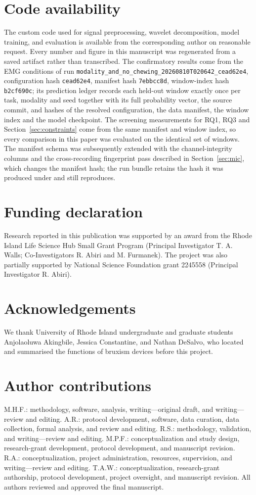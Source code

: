 \documentclass[pdflatex,sn-nature,iicol]{sn-jnl}
\begin{document}
\section*{Code availability}
The custom code used for signal preprocessing, wavelet decomposition, model training, and evaluation is available from the corresponding author on reasonable request. Every number and figure in this manuscript was regenerated from a saved artifact rather than transcribed. The confirmatory results come from the EMG conditions of run \texttt{modality\_and\_no\_chewing\_}\allowbreak\texttt{20260810T020642\_cead62e4}, configuration hash \texttt{cead62e4}, manifest hash \texttt{7ebbcc8d}, window-index hash \texttt{b2cf690c}; its prediction ledger records each held-out window exactly once per task, modality and seed together with its full probability vector, the source commit, and hashes of the resolved configuration, the data manifest, the window index and the model checkpoint. The screening measurements for RQ1, RQ3 and Section~\ref{sec:constraints} come from the same manifest and window index, so every comparison in this paper was evaluated on the identical set of windows. The manifest schema was subsequently extended with the channel-integrity columns and the cross-recording fingerprint pass described in Section~\ref{sec:mic}, which changes the manifest hash; the run bundle retains the hash it was produced under and still reproduces.

\section*{Funding declaration}
Research reported in this publication was supported by an award from the Rhode Island Life Science Hub Small Grant Program (Principal Investigator T. A. Walls; Co-Investigators R. Abiri and M. Furmanek). The project was also partially supported by National Science Foundation grant 2245558 (Principal Investigator R. Abiri).

\section*{Acknowledgements}
We thank University of Rhode Island undergraduate and graduate students Anjolaoluwa Akingbile, Jessica Constantine, and Nathan DeSalvo, who located and summarised the functions of bruxism devices before this project.

\section*{Author contributions}
M.H.F.: methodology, software, analysis, writing---original draft, and writing---review and editing. A.R.: protocol development, software, data curation, data collection, formal analysis, and review and editing. R.S.: methodology, validation, and writing---review and editing. M.P.F.: conceptualization and study design, research-grant development, protocol development, and manuscript revision. R.A.: conceptualization, project administration, resources, supervision, and writing---review and editing. T.A.W.: conceptualization, research-grant authorship, protocol development, project oversight, and manuscript revision. All authors reviewed and approved the final manuscript.
\end{document}
